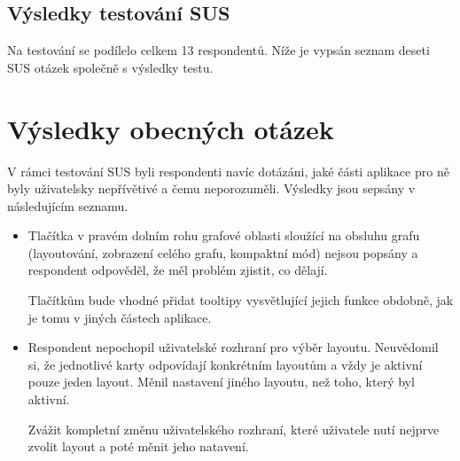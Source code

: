 \subsection{Výsledky testování SUS}

Na testování se podílelo celkem 13 respondentů. Níže je vypsán seznam deseti SUS otázek společně s výsledky testu.

\dataone


\section{Výsledky obecných otázek}
V rámci testování SUS byli respondenti navíc dotázáni, jaké části aplikace pro ně byly uživatelsky nepřívětivé a čemu neporozuměli. Výsledky jsou sepsány v následujícím seznamu.

\begin{itemize}
    \item Tlačítka v pravém dolním rohu grafové oblasti sloužící na obsluhu grafu (layoutování, zobrazení celého grafu, kompaktní mód) nejsou popsány a respondent odpověděl, že měl problém zjistit, co dělají.

    Tlačítkům bude vhodné přidat tooltipy vysvětlující jejich funkce obdobně, jak je tomu v jiných částech aplikace.
    \item Respondent nepochopil uživatelské rozhraní pro výběr layoutu. Neuvědomil si, že jednotlivé karty odpovídají konkrétním layoutům a vždy je aktivní pouze jeden layout. Měnil nastavení jiného layoutu, než toho, který byl aktivní.

    Zvážit kompletní změnu uživatelského rozhraní, které uživatele nutí nejprve zvolit layout a poté měnit jeho natavení.
\end{itemize}


